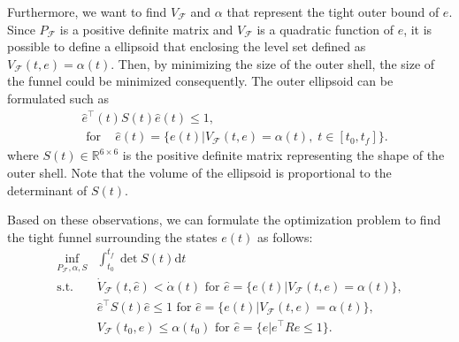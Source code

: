 \documentclass[letterpaper, 10 pt, conference]{ieeeconf}  %
\begin{document}
Furthermore, we want to find $V_\mathcal{F}$ and $\alpha$ that represent the tight outer bound of $e$. 
Since $P_\mathcal{F}$ is a positive definite matrix and $V_\mathcal{F}$ is a quadratic function of $e$, 
it is possible to define a ellipsoid that enclosing the level set defined as $V_\mathcal{F}(t,e) = \alpha(t)$.
Then, by minimizing the size of the outer shell, the size of the funnel could be minimized consequently.
The outer ellipsoid can be formulated such as
\begin{align}
&\hat{e}^\top(t) S(t) \hat{e}(t) \leq 1,  \nonumber \\
&\text{ for }\;\;\;\hat{e}(t) = \{e(t)|V_\mathcal{F}(t,e) = \alpha(t),\;t \in [t_0,t_f]\}. \nonumber
\end{align}
where $S(t)\in \mathbb{R}^{6\times 6}$ is the positive definite matrix representing the shape of the outer shell. Note that the volume of the ellipsoid is proportional to the determinant of $S(t)$.

Based on these observations, we can formulate the optimization problem to find the tight funnel surrounding the states $e(t)$ as follows:
\begin{equation}
\begin{array}{rl}
\displaystyle{\inf_{P_\mathcal{F},\alpha,S}} & \int_{t_0}^{t_f} \det{S(t)}\text{d}t \label{eq:optim1} \\
\displaystyle{\text{s.t.}}& \dot{V}_\mathcal{F}(t,\hat{e}) < \dot{\alpha}(t)\text{ for }\hat{e} = \{e(t)|V_\mathcal{F}(t,e) = \alpha(t)\}, \nonumber \\
& \hat{e}^\top S(t) \hat{e} \leq 1\text{ for }\hat{e} = \{e(t)|V_\mathcal{F}(t,e) = \alpha(t)\}, \nonumber \\
& V_\mathcal{F}(t_0,\hat{e}) \leq \alpha(t_0)\text{ for }\hat{e} = \{e|e^\top R e \leq 1\}. \nonumber
\end{array}
\end{equation}
\end{document}
